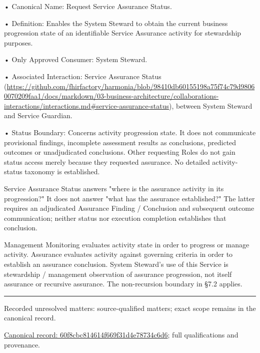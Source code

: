 •
Canonical Name: Request Service Assurance Status.



•
Definition: Enables the System Steward to obtain the current business progression state of an identifiable Service Assurance activity for stewardship purposes.



•
Only Approved Consumer: System Steward.



•
Associated Interaction: Service Assurance Status (\url{https://github.com/fhirfactory/harmonia/blob/98410db60155198a75f74c79d98060070209faa1/docs/markdown/03-business-architecture/collaborations-interactions/interactions.md#service-assurance-status}), between System Steward and Service Guardian.



•
Status Boundary: Concerns activity progression state. It does not communicate provisional findings, incomplete assessment results as conclusions, predicted outcomes or unadjudicated conclusions. Other requesting Roles do not gain status access merely because they requested assurance. No detailed activity-status taxonomy is established.



Service Assurance Status answers "where is the assurance activity in its progression?" It does not answer "what has the assurance established?" The latter requires an adjudicated Assurance Finding / Conclusion and subsequent outcome communication; neither status nor execution completion establishes that conclusion.



Management Monitoring evaluates activity state in order to progress or manage activity. Assurance evaluates activity against governing criteria in order to establish an assurance conclusion. System Steward's use of this Service is stewardship / management observation of assurance progression, not itself assurance or recursive assurance. The non-recursion boundary in §7.2 applies.



\medskip\hrule\medskip

{\small Recorded unresolved matters: source-qualified matters; exact scope remains in the canonical record.}\par
{\footnotesize \href{../../../../continuum/business/business-service/60f8cbc814614f669f31d4e78734c6d6.md}{Canonical record: 60f8cbc814614f669f31d4e78734c6d6}; full qualifications and provenance.}\par
